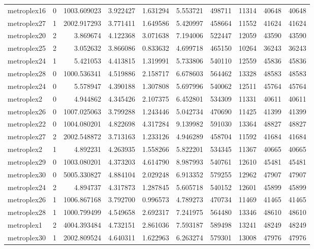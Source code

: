 \documentclass[../../../thesis.tex]{subfiles}
\begin{document}
\begin{longtable}{|l|r|r|r|r|r|r|r|r|r|}
metroplex16 & 0 & 1003.609023 & 3.922427 & 1.631294 & 5.553721 & 498711 & 11314 & 40648 & 40648 \\
metroplex27 & 1 & 2002.917293 & 3.771411 & 1.649586 & 5.420997 & 458664 & 11552 & 41624 & 41624 \\
metroplex20 & 2 & 3.869674 & 4.122368 & 3.071638 & 7.194006 & 522447 & 12059 & 43590 & 43590 \\
metroplex25 & 2 & 3.052632 & 3.866086 & 0.833632 & 4.699718 & 465150 & 10264 & 36243 & 36243 \\
metroplex24 & 1 & 5.421053 & 4.413815 & 1.319991 & 5.733806 & 540110 & 12559 & 45836 & 45836 \\
metroplex28 & 0 & 1000.536341 & 4.519886 & 2.158717 & 6.678603 & 564462 & 13328 & 48583 & 48583 \\
metroplex24 & 0 & 5.578947 & 4.390188 & 1.307808 & 5.697996 & 540062 & 12511 & 45764 & 45764 \\
metroplex2 & 0 & 4.944862 & 4.345426 & 2.107375 & 6.452801 & 534309 & 11331 & 40611 & 40611 \\
metroplex26 & 0 & 1007.025063 & 3.799288 & 1.243446 & 5.042734 & 470690 & 11425 & 41399 & 41399 \\
metroplex22 & 0 & 1004.080201 & 4.822698 & 4.317284 & 9.139982 & 591030 & 13364 & 48827 & 48827 \\
metroplex27 & 2 & 2002.548872 & 3.713163 & 1.233126 & 4.946289 & 458704 & 11592 & 41684 & 41684 \\
metroplex2 & 1 & 4.892231 & 4.263935 & 1.558266 & 5.822201 & 534345 & 11367 & 40665 & 40665 \\
metroplex29 & 0 & 1003.080201 & 4.373203 & 4.614790 & 8.987993 & 540761 & 12610 & 45481 & 45481 \\
metroplex30 & 0 & 5005.330827 & 4.884104 & 2.029248 & 6.913352 & 579255 & 12962 & 47907 & 47907 \\
metroplex24 & 2 & 4.894737 & 4.317873 & 1.287845 & 5.605718 & 540152 & 12601 & 45899 & 45899 \\
metroplex26 & 1 & 1006.867168 & 3.792700 & 0.996573 & 4.789273 & 470734 & 11469 & 41465 & 41465 \\
metroplex28 & 1 & 1000.799499 & 4.549658 & 2.692317 & 7.241975 & 564480 & 13346 & 48610 & 48610 \\
metroplex1 & 2 & 4004.393484 & 4.732151 & 2.861036 & 7.593187 & 589498 & 13241 & 48249 & 48249 \\
metroplex30 & 1 & 2002.809524 & 4.640311 & 1.622963 & 6.263274 & 579301 & 13008 & 47976 & 47976 \\

\end{longtable}
\end{document}
